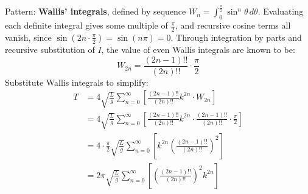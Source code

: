 \documentclass[preview]{standalone}
\begin{document}
\color{white}

Pattern: \textbf{Wallis' integrals}, defined by sequence $W_n =
\int_{0}^{\frac{\pi}{2}} \sin^n \theta \, d\theta$. Evaluating each
definite integral gives some multiple of $\frac{\pi}{2}$, and recursive cosine terms all vanish, since $\sin(2n \cdot \frac{\pi}{2}) = \sin(n\pi) = 0$. Through integration by parts and recursive
substitution of $I$, the value of even Wallis integrals are known to be:
\[
  W_{2n} = \frac{(2n-1)!!}{(2n)!!} \cdot \frac{\pi}{2}
\]
Substitute Wallis integrals to simplify:
\begin{align*}
    T &= 4 \sqrt{\frac{L}{g}} \sum_{n=0}^{\infty} \left[\frac{ (2n-1)!!}{(2n)!!} k^{2n} \cdot W_{2n}\right] \\
    &= 4 \sqrt{\frac{L}{g}} \sum_{n=0}^{\infty} \left[\frac{ (2n-1)!!}{(2n)!!} k^{2n} \cdot \frac{(2n-1)!!}{(2n)!!} \cdot \frac{\pi}{2}\right] \\
    &= 4 \cdot \frac{\pi}{2} \sqrt{\frac{L}{g}} \sum_{n=0}^{\infty} \left[ k^{2n} \left(\frac{(2n-1)!!}{(2n)!!}\right)^2 \right] \\
    &= 2\pi \sqrt{\frac{L}{g}} \sum_{n=0}^{\infty} \left[ \left(\frac{(2n-1)!!}{(2n)!!}\right)^2 k^{2n} \right]
\end{align*}
\end{document}
